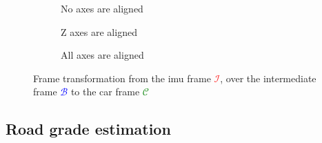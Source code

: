 \begin{figure}[htbp]
	\centering
	\begin{subfigure}[b]{0.3\textwidth}
		\centering
		
		\caption{No axes are aligned}
		\label{fig:tikz_frame_transformation_init}
	\end{subfigure}
	\hfill
	\begin{subfigure}[b]{0.3\textwidth}
		\centering
		
		\caption{Z axes are aligned}
		\label{fig:tikz_frame_transformation_intermediate}
	\end{subfigure}
	\hfill
	\begin{subfigure}[b]{0.3\textwidth}
		\centering
		
		\caption{All axes are aligned}
		\label{fig:tikz_frame_transformation_final}
	\end{subfigure}
	\caption[Frame transformation]{Frame transformation from the \gls{imu} frame \textcolor{red}{$\mathcal{I}$}, over the intermediate frame \textcolor{blue}{$\mathcal{B}$} to the car frame \textcolor{green}{$\mathcal{C}$}}
	\label{fig:tikz_frame_transformation}
\end{figure}

\subsection{Road grade estimation}
\label{ssec:road_grade_estimation}
